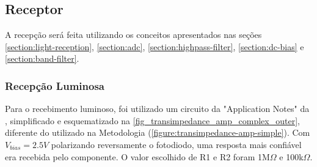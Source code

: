 	\subsection{Receptor}
	
	A recepção será feita utilizando os conceitos apresentados nas seções \ref{section:light-reception}, \ref{section:adc},  \ref{section:highpass-filter}, \ref{section:dc-bias} e \ref{section:band-filter}.
	
	\subsubsection{Recepção Luminosa}
	Para o recebimento luminoso, foi utilizado um circuito da "Application Notes" da \cite{datasheet-opa380}, simplificado e esquematizado na \autoref{fig_transimpedance_amp_complex_outer}, diferente do utilizado na Metodologia (\autoref{figure:transimpedance-amp-simple}). Com $V_{bias} = 2.5V$ polarizando reversamente o fotodiodo, uma resposta mais confiável era recebida pelo componente. O valor escolhido de R1 e R2 foram  1M$\Omega$ e 100k$\Omega$.
	
